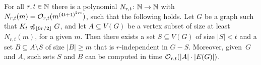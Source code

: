  \setcounter{aux}{\value{theorem}}
 \setcounter{theorem}{\value{uqw}}
  \setcounter{auxsec}{\value{section}}
 \setcounter{section}{1}
 \begin{theorem}
   For all $r,t\in \mathbb{N}$ there is a polynomial $N_{r,t}\colon \mathbb{N}\to \mathbb{N}$
   with $N_{r,t}(m)= \mathcal{O}_{r,t}{(m^{{(4t+1)}^{2rt}})}$, such that the
   following holds.  Let $G$ be a graph such that
   $K_t\not\preccurlyeq_{\lfloor 9r/2\rfloor} G$, and let $A\subseteq V(G)$
   be a vertex subset of size at least $N_{r,t}(m)$, for a given $m$.
   Then there exists a set $S\subseteq V(G)$ of size $|S|<t$ and a set
   $B\subseteq A\setminus S$ of size $|B|\geq m$ that is
   $r$-independent in $G-S$.  Moreover, given~$G$ and $A$, such sets
   $S$ and $B$ can be computed in time $\mathcal{O}_{r,t}(|A|\cdot |E(G)|)$.
 \end{theorem}
 \setcounter{theorem}{\value{aux}}
 \setcounter{section}{\value{auxsec}}
